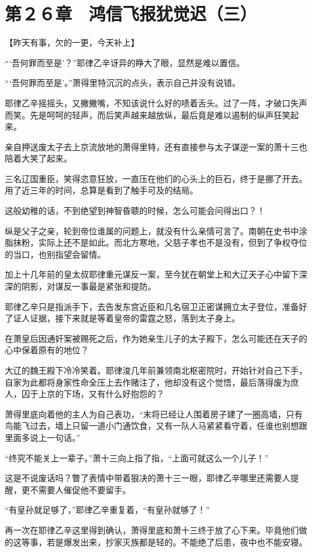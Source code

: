 \section{第２６章　鸿信飞报犹觉迟（三）}

【昨天有事，欠的一更，今天补上】

“‘吾何罪而至是’？”耶律乙辛讶异的睁大了眼，显然是难以置信。

“‘吾何罪而至是’。”萧得里特沉沉的点头，表示自己并没有说错。

耶律乙辛摇摇头，又撇撇嘴，不知该说什么好的啧着舌头。过了一阵，才破口失声而笑。先是呵呵的轻声，而后笑声越来越放纵，最后竟是难以遏制的纵声狂笑起来。

亲自押送废太子去上京流放地的萧得里特，还有直接参与太子谋逆一案的萧十三也陪着大笑了起来。

三名辽国重臣，笑得恣意狂放，一直压在他们的心头上的巨石，终于是挪了开去。用了近三年的时间，总算是看到了触手可及的结局。

这般幼稚的话，不到绝望到神智昏聩的时候，怎么可能会问得出口？！

纵是父子之亲，轮到帝位谁属的问题上，就没有什么亲情可言了。南朝在史书中涂脂抹粉，实际上还不是如此。而北方寒地，父慈子孝也不是没有，但到了争权夺位的当口，也别指望会留情。

加上十几年前的皇太叔耶律重元谋反一案，至今犹在朝堂上和大辽天子心中留下深深的阴影，对谋反一事最是紧张和提防。

耶律乙辛只是指派手下，去告发东宫近臣和几名宿卫正密谋拥立太子登位，准备好了证人证据，接下来就是等着皇帝的雷霆之怒，落到太子身上。

在萧皇后因通奸案被赐死之后，作为她亲生儿子的太子殿下，怎么可能还在天子的心中保着原有的地位？

大辽的魏王殿下冷冷笑着。耶律浚几年前兼领南北枢密院时，开始针对自己下手，自家为此都将身家性命全压上去作赌注了，他却没有这个觉悟，最后落得废为庶人，囚于上京的下场，又有什么好抱怨的？

萧得里底向着他的主人为自己表功，“末将已经让人围着房子建了一圈高墙，只有鸟能飞过去，墙上只留一道小门通饮食，又有一队人马紧紧看守着，任谁也别想跟里面多说上一句话。”

“终究不能关上一辈子。”萧十三向上指了指，“上面可就这么一个儿子！”

这是不说废话吗？瞥了表情中带着狠决的萧十三一眼，耶律乙辛哪里还需要人提醒，更不需要人催促他不要留手。

“有皇孙就足够了，”耶律乙辛重复着，“有皇孙就够了！”

再一次在耶律乙辛这里得到确认，萧得里底和萧十三终于放了心下来。毕竟他们做的这等事，若是爆发出来，抄家灭族都是轻的。不能绝了后患，夜中也不能安寝。

